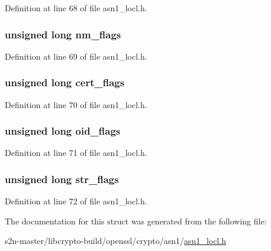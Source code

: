 Definition at line 68 of file asn1\+\_\+locl.\+h.

\subsubsection[{\texorpdfstring{nm\+\_\+flags}{nm_flags}}]{\setlength{\rightskip}{0pt plus 5cm}unsigned long nm\+\_\+flags}\hypertarget{structasn1__pctx__st_a7198bf94e7d93399542ffd768fdff506}{}\label{structasn1__pctx__st_a7198bf94e7d93399542ffd768fdff506}


Definition at line 69 of file asn1\+\_\+locl.\+h.

\subsubsection[{\texorpdfstring{cert\+\_\+flags}{cert_flags}}]{\setlength{\rightskip}{0pt plus 5cm}unsigned long cert\+\_\+flags}\hypertarget{structasn1__pctx__st_a50577c2360374d8981129375814b4aaa}{}\label{structasn1__pctx__st_a50577c2360374d8981129375814b4aaa}


Definition at line 70 of file asn1\+\_\+locl.\+h.

\subsubsection[{\texorpdfstring{oid\+\_\+flags}{oid_flags}}]{\setlength{\rightskip}{0pt plus 5cm}unsigned long oid\+\_\+flags}\hypertarget{structasn1__pctx__st_abe6d3572d064b442540826f28716a90d}{}\label{structasn1__pctx__st_abe6d3572d064b442540826f28716a90d}


Definition at line 71 of file asn1\+\_\+locl.\+h.

\subsubsection[{\texorpdfstring{str\+\_\+flags}{str_flags}}]{\setlength{\rightskip}{0pt plus 5cm}unsigned long str\+\_\+flags}\hypertarget{structasn1__pctx__st_ada193999dd8e335524373ff079a004a8}{}\label{structasn1__pctx__st_ada193999dd8e335524373ff079a004a8}


Definition at line 72 of file asn1\+\_\+locl.\+h.



The documentation for this struct was generated from the following file\+:\begin{DoxyCompactItemize}
\item 
s2n-\/master/libcrypto-\/build/openssl/crypto/asn1/\hyperlink{asn1__locl_8h}{asn1\+\_\+locl.\+h}\end{DoxyCompactItemize}
